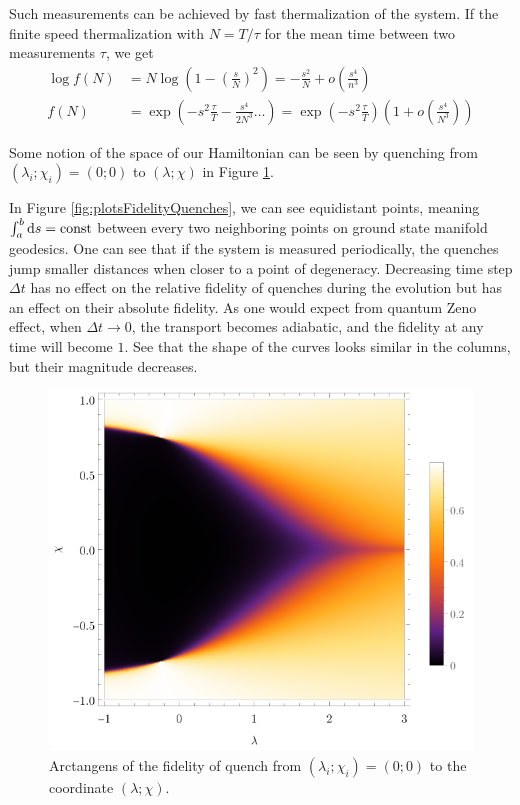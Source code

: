 Such measurements can be achieved by fast thermalization of the system. If the finite speed thermalization with $N=T/\tau$ for the mean time between two measurements $\tau$, we get
\begin{equation}
    \begin{split}
        \log f(N) &= N \log \left(1-\left(\frac{s}{N}\right)^2\right) = -\frac{s^2}{N}+o\left(\frac{s^4}{n^3}\right)\\
        f(N) &= \exp\left(-s^2\frac{\tau}{T}-\frac{s^4}{2 N^3}\dots\right) = \exp\left(-s^2\frac{\tau}{T}\right)\left(1+o\left(\frac{s^4}{N^3}\right)\right)
    \end{split}
\end{equation}

Some notion of the space of our Hamiltonian can be seen by quenching from $(\lambda_i;\chi_i)=(0;0)$ to $(\lambda;\chi)$ in Figure \ref{fig:quenchFidelityFrom00}.


In Figure \ref{fig:plotsFidelityQuenches}, we can see equidistant points, meaning $\int_{a}^{b} \mathrm{d} s=\text{const}$ between every two neighboring points on ground state manifold geodesics. One can see that if the system is measured periodically, the quenches jump smaller distances when closer to a point of degeneracy. Decreasing time step $\Delta t$ has no effect on the relative fidelity of quenches during the evolution but has an effect on their absolute fidelity. As one would expect from quantum Zeno effect, when $\Delta t\rightarrow 0$, the transport becomes adiabatic, and the fidelity at any time will become $1$. See that the shape of the curves looks similar in the columns, but their magnitude decreases.

\begin{figure}[H]
    \centering
    \includegraphics[scale=1.2]{../img/quenchFidelityFrom00.pdf}
    \caption{Arctangens of the fidelity of quench from $(\lambda_i;\chi_i)=(0;0)$ to the coordinate $(\lambda;\chi)$.}
    \label{fig:quenchFidelityFrom00}    
\end{figure}

